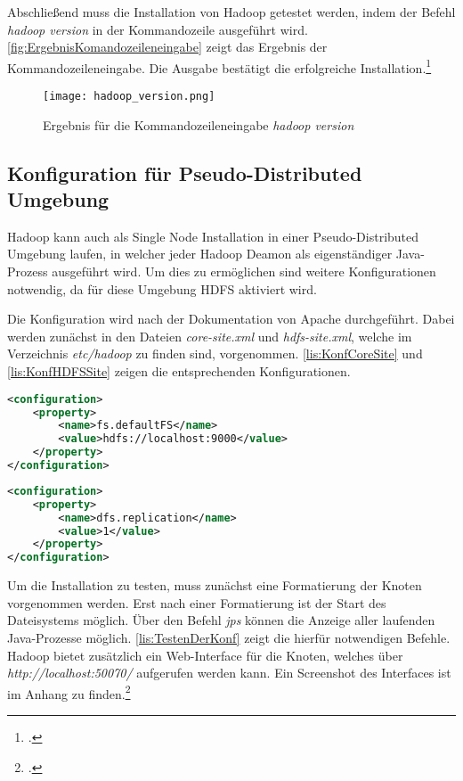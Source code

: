 Abschließend muss die Installation von Hadoop getestet werden, indem der Befehl \textit{hadoop version} in der Kommandozeile ausgeführt wird. \autoref{fig:ErgebnisKomandozeileneingabe} zeigt das Ergebnis der Kommandozeileneingabe. Die Ausgabe bestätigt die erfolgreiche Installation.\footcite[Vgl.][S. 32 f.]{Freiknecht.2014}

\begin{figure}[h]
	\texttt{[image: hadoop\_version.png]}
	\caption{Ergebnis für die Kommandozeileneingabe \textit{hadoop version}}
	\label{fig:ErgebnisKomandozeileneingabe}
\end{figure}

\subsection{Konfiguration für Pseudo-Distributed Umgebung}
Hadoop kann auch als Single Node Installation in einer Pseudo-Distributed Umgebung laufen, in welcher jeder Hadoop Deamon als eigenständiger Java-Prozess ausgeführt wird. Um dies zu ermöglichen sind weitere Konfigurationen notwendig, da für diese Umgebung \ac{HDFS} aktiviert wird.

Die Konfiguration wird nach der Dokumentation von Apache durchgeführt. Dabei werden zunächst in den Dateien \textit{core-site.xml} und \textit{hdfs-site.xml}, welche im Verzeichnis \textit{etc/hadoop} zu finden sind, vorgenommen. \autoref{lis:KonfCoreSite} und \autoref{lis:KonfHDFSSite} zeigen die entsprechenden Konfigurationen. \\

\pagebreak
\begin{lstlisting}[language=XML, caption=Konfiguration in der core-site.xml, label=lis:KonfCoreSite]
<configuration>
	<property>
		<name>fs.defaultFS</name>
		<value>hdfs://localhost:9000</value>
	</property>
</configuration>
\end{lstlisting}

\begin{lstlisting}[language=XML, caption=Konfiguration in der hdfs-site.xml, label=lis:KonfHDFSSite]
<configuration>
	<property>
		<name>dfs.replication</name>
		<value>1</value>
	</property>
</configuration>
\end{lstlisting}

Um die Installation zu testen, muss zunächst eine Formatierung der Knoten vorgenommen werden. Erst nach einer Formatierung ist der Start des Dateisystems möglich. Über den Befehl \textit{jps} können die Anzeige aller laufenden Java-Prozesse möglich. \autoref{lis:TestenDerKonf} zeigt die hierfür notwendigen Befehle. Hadoop bietet zusätzlich ein Web-Interface für die Knoten, welches über \textit{http://localhost:50070/} aufgerufen werden kann. Ein Screenshot des Interfaces ist im Anhang zu finden.\footcite[Vgl.][]{ApacheHadoopDoku.2015} \\

